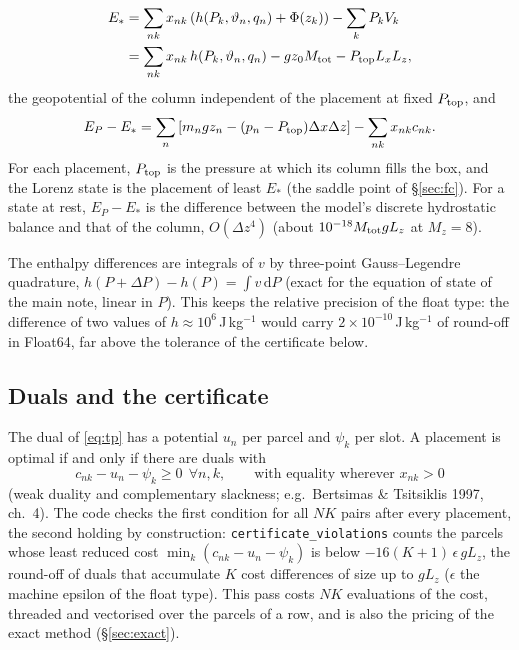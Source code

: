 \documentclass[11pt,a4paper]{article}
\newcommand{\vt}{\vartheta}
\newcommand{\code}[1]{\texttt{#1}}
\newcommand{\Mtot}{M_{\rm tot}}
\newcommand{\Ptop}{P_{\rm top}}
\begin{document}
\begin{itemize}
\begin{equation}
        \end{equation}
        \begin{equation}
          \begin{aligned}
            E_*&=\sum_{nk}x_{nk}\left(h(P_k,\vt_n,q_n)+\Phi(z_k)\right)-\sum_kP_kV_k\\
               &=\sum_{nk}x_{nk}\,h(P_k,\vt_n,q_n)-gz_0\Mtot-\Ptop L_xL_z ,
          \end{aligned}
        \end{equation}
        the geopotential of the column independent of the placement at fixed $\Ptop$, and
        \begin{equation}
          E_P-E_*=\sum_n\left[m_ngz_n-(p_n-\Ptop)\Delta x\Delta z\right]-\sum_{nk}x_{nk}c_{nk}.
        \end{equation}
        For each placement, $\Ptop$ is the pressure at which its column fills the box, and the Lorenz state is the
        placement of least $E_*$ (the saddle point of \S\ref{sec:fc}).
        For a state at rest, $E_P-E_*$ is the difference between the model's discrete hydrostatic balance and that of the
        column, $O(\Delta z^4)$ (about $10^{-18}\Mtot gL_z$ at $M_z=8$).
\end{itemize}
The enthalpy differences are integrals of $v$ by three-point Gauss--Legendre quadrature,
$h(P+\Delta P)-h(P)=\int v\,\mathrm{d}P$ (exact for the equation of state of the main note, linear in $P$). This keeps the
relative precision of the float type: the difference of two values of $h\approx10^6$\,J\,kg$^{-1}$ would carry
$2\times10^{-10}$\,J\,kg$^{-1}$ of round-off in Float64, far above the tolerance of the certificate below.

\subsection{Duals and the certificate}\label{sec:dual}
The dual of \eqref{eq:tp} has a potential $u_n$ per parcel and $\psi_k$ per slot. A placement is optimal if and only if
there are duals with
\begin{equation}
  c_{nk}-u_n-\psi_k\ge0\ \ \forall n,k,\qquad\text{with equality wherever }x_{nk}>0
  \label{eq:dual}
\end{equation}
(weak duality and complementary slackness; e.g.\ Bertsimas \& Tsitsiklis 1997, ch.~4). The code checks the first condition
for all $NK$ pairs after every placement, the second holding by construction: \code{certificate\_violations} counts the
parcels whose least reduced cost $\min_k(c_{nk}-u_n-\psi_k)$ is below $-16(K+1)\,\epsilon\,gL_z$, the round-off of duals that
accumulate $K$ cost differences of size up to $gL_z$ ($\epsilon$ the machine epsilon of the float type). This pass costs
$NK$ evaluations of the cost, threaded and vectorised over the parcels of a row, and is also the pricing of the exact method
(\S\ref{sec:exact}).
\end{document}
